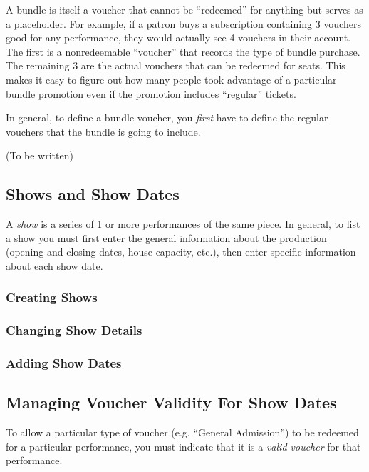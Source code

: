 A bundle is itself a voucher that cannot be ``redeemed'' for anything
but serves as a placeholder.  For example, if a patron buys a
subscription containing 3 vouchers good for any performance, they would
actually see 4 vouchers in their account.  The first is a nonredeemable
``voucher'' that records the type of bundle purchase.  The remaining 3
are the actual vouchers that can be redeemed for seats.  This makes it
easy to figure out how many people took advantage of a particular
bundle promotion even if the promotion includes ``regular'' tickets.

In general, to define a bundle voucher, you \emph{first} have to define the
regular vouchers that the bundle is going to include.

(To be written)

\subsection{Shows and Show Dates}

A \emph{show} is a series of 1 or more performances of the same piece.
In general, to list a show you must first enter the general information
about the production (opening and closing dates, house capacity, etc.),
then enter specific information about each show date.

\subsubsection{Creating Shows}
\label{sec:addingshows}


\subsubsection{Changing Show Details}
\label{sec:changingshowdetails}

\subsubsection{Adding Show Dates}
\label{sec:addingshowdates}

\subsection{Managing Voucher Validity For Show Dates}

To allow a particular type of voucher (e.g. ``General Admission'') to be
redeemed for a particular performance, you must indicate that it is a
\emph{valid voucher} for that performance.


